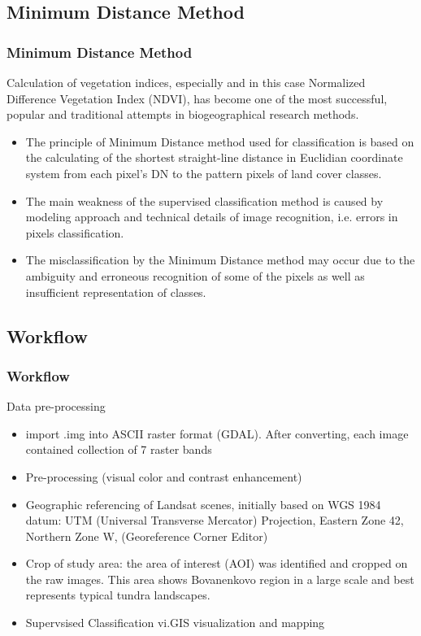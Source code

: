 \documentclass[pdflatex,compress,8pt,
	xcolor={dvipsnames,dvipsnames,svgnames,x11names,table},
	hyperref={colorlinks = true,breaklinks = true, urlcolor = NavyBlue, breaklinks = true}]{beamer}
\begin{document}
\subsection{Minimum Distance Method}
\begin{frame}\frametitle{Minimum Distance Method}
Calculation of vegetation indices, especially and in this case Normalized Difference Vegetation Index (NDVI), has become one of the most successful, popular and traditional attempts in biogeographical research methods.
\begin{itemize}
         \item The principle of Minimum Distance method used for classification is based on the calculating of the shortest straight-line distance in Euclidian coordinate system from each pixel’s DN to the pattern pixels of land cover classes.
	\item The main weakness of the supervised classification method is caused by modeling approach and technical details of image recognition, i.e. errors in pixels classification.
	\item The misclassification by the Minimum Distance method may occur due to the ambiguity and erroneous recognition of some of the pixels as well as insufficient representation of classes.
\end{itemize}
\end{frame}

\subsection{Workflow}
\begin{frame}\frametitle{Workflow}
Data pre-processing
\begin{itemize}
         \item import .img into ASCII raster format (GDAL). After converting, each image contained collection of 7 raster bands 
	\item Pre-processing (visual color and contrast enhancement) 
	\item Geographic referencing of Landsat scenes, initially based on  WGS 1984 datum: UTM (Universal Transverse Mercator) Projection, Eastern Zone 42, Northern Zone W, (Georeference Corner Editor)
	\item Crop of study area: the area of interest (AOI) was identified and cropped on the raw images. This area shows Bovanenkovo region in a large scale and best represents typical tundra landscapes.
	\item Supervsised Classification vi.GIS visualization and mapping
\end{itemize}
\end{frame}
\end{document}
